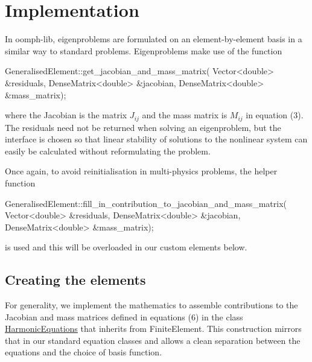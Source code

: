 \hypertarget{index_impl}{}\section{Implementation}\label{index_impl}
In {\ttfamily oomph-\/lib}, eigenproblems are formulated on an element-\/by-\/element basis in a similar way to standard problems. Eigenproblems make use of the function 
\begin{DoxyCode}
GeneralisedElement::get\_jacobian\_and\_mass\_matrix(
  Vector<double> &residuals, 
  DenseMatrix<double> &jacobian,
  DenseMatrix<double> &mass\_matrix);
\end{DoxyCode}
 where the Jacobian is the matrix $J_{ij}$ and the mass matrix is $M_{ij}$ in equation (3). The residuals need not be returned when solving an eigenproblem, but the interface is chosen so that linear stability of solutions to the nonlinear system can easily be calculated without reformulating the problem.

Once again, to avoid reinitialisation in multi-\/physics problems, the helper function 
\begin{DoxyCode}
GeneralisedElement::fill\_in\_contribution\_to\_jacobian\_and\_mass\_matrix(
  Vector<double> &residuals, 
  DenseMatrix<double> &jacobian,
  DenseMatrix<double> &mass\_matrix);
\end{DoxyCode}
 is used and this will be overloaded in our custom elements below.\hypertarget{index_equations}{}\subsection{Creating the elements}\label{index_equations}
For generality, we implement the mathematics to assemble contributions to the Jacobian and mass matrices defined in equations (6) in the class {\ttfamily \hyperlink{classHarmonicEquations}{Harmonic\+Equations}} that inherits from {\ttfamily Finite\+Element}. This construction mirrors that in our standard equation classes and allows a clean separation between the equations and the choice of basis function.

